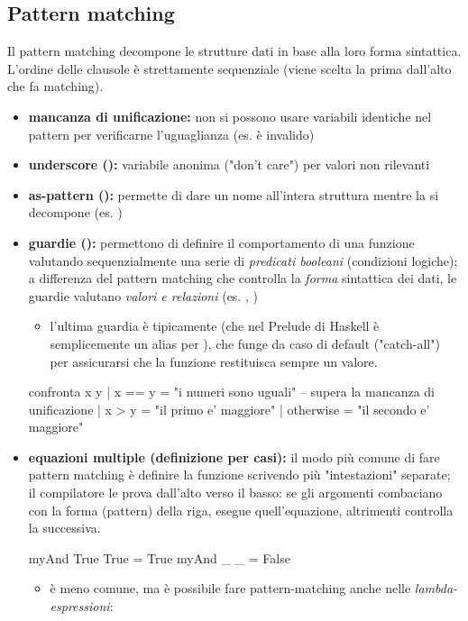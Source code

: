 \documentclass[a4paper,11pt]{report}
\begin{document}
\subsection{Pattern matching}
Il pattern matching decompone le strutture dati in base alla loro forma sintattica. L'ordine delle clausole è strettamente sequenziale (viene scelta la prima dall'alto che fa matching).
\begin{itemize}
    \item \textbf{mancanza di unificazione:} non si possono usare variabili identiche nel pattern per verificarne l'uguaglianza (es.  è invalido)
    \item \textbf{underscore (\code{\_}):} variabile anonima ("don't care") per valori non rilevanti
    \item \textbf{as-pattern ():} permette di dare un nome all'intera struttura mentre la si decompone (es. )
\item \textbf{guardie (\code{|}):} permettono di definire il comportamento di una funzione valutando sequenzialmente una serie di \textit{predicati booleani} (condizioni logiche); a differenza del pattern matching che controlla la \textit{forma} sintattica dei dati, le guardie valutano \textit{valori e relazioni} (es. , )
    \begin{itemize}
    \item l'ultima guardia è tipicamente  (che nel Prelude di Haskell è semplicemente un alias per ), che funge da caso di default ("catch-all") per assicurarsi che la funzione restituisca sempre un valore.
    \end{itemize}
\begin{haskellbox}{}
confronta x y
  | x == y    = "i numeri sono uguali" -- supera la mancanza di unificazione
  | x > y     = "il primo e' maggiore"
  | otherwise = "il secondo e' maggiore"
\end{haskellbox}{}
\item \textbf{equazioni multiple (definizione per casi):} il modo più comune di fare pattern matching è definire la funzione scrivendo più "intestazioni" separate; il compilatore le prova dall'alto verso il basso: se gli argomenti combaciano con la forma (pattern) della riga, esegue quell'equazione, altrimenti controlla la successiva.
\begin{haskellbox}{}
    myAnd True True = True
    myAnd   _   _   = False
\end{haskellbox}{}
\begin{itemize}
    \item è meno comune, ma è possibile fare pattern-matching anche nelle \textit{lambda-espressioni}:
\end{itemize}
\end{itemize}
\end{document}

